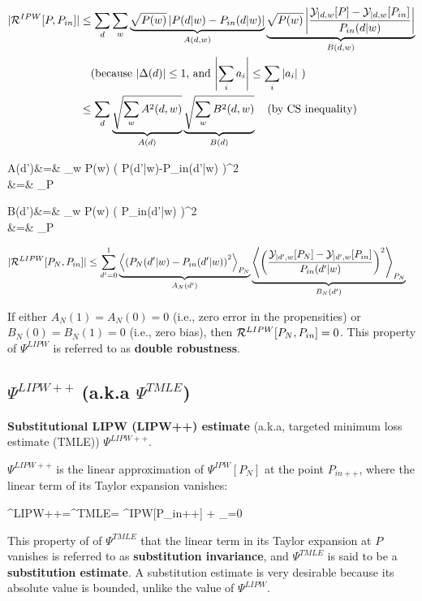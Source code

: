 \begin{align}
|{\cal R}^{IPW}[P,P_{in}]|&\leq
\sum_d \sum_w
\underbrace{\sqrt{P(w)}
\left|
P(d|w)-P_{in}(d|w)
\right|}_{A(d,w)}
\underbrace{\sqrt{P(w)}
\left|
\frac{
{\cal Y}_{|d,w}[P]-{\cal Y}_{|d,w}[P_{in}]}
{P_{in}(d|w)}
\right|}_{B(d,w)}
\nonumber
\\&
\quad\text{(because
$|\Delta(d)|\leq 1$, and $\left|\sum_i a_i\right|\leq \sum_i |a_i|$ )}
\\
&\leq
\sum_d
\underbrace{\sqrt{\sum_w A^2(d,w)}}_{A(d)}
\underbrace{\sqrt{\sum_w B^2(d,w)}}_{B(d)}
\quad \text{(by CS inequality)}
\end{align}

\beqa
A(d')&=&
\sum_w P(w)
\left(
P(d'|w)-P_{in}(d'|w)
\right)^2
\\
&=&
_P
\eeqa

\beqa
B(d')&=&
\sum_w P(w)
\left(
{P_{in}(d'|w)}
\right)^2
\\
&=&
_P
\eeqa

\begin{align}
|{\cal R}^{LIPW}[P_N,P_{in}]|&\leq
\sum_{d'=0}^1
\underbrace{
\left\langle
\left(
P_N(d'|w)-P_{in}(d'|w)
\right)^2
\right\rangle_{P_N}
}_{A_N(d')}
\underbrace{
\left\langle
\left(
\frac{
{\cal Y}_{|d',w}[P_N]-{\cal Y}_{|d',w}[P_{in}]}
{P_{in}(d'|w)}
\right)^2
\right\rangle_{P_N}
}_{B_N(d')}
\end{align}

If either $A_N(1)=A_N(0)=0$ (i.e.,
zero error in the propensities) or $B_N(0)=B_N(1)=0$ (i.e.,
zero bias),
then ${\cal R}^{LIPW}[P_N,P_{in}]=0$.
This property
of $\Psi^{LIPW}$ is referred to as {\bf double robustness}.


\subsection{$\Psi^{LIPW++}$ (a.k.a $\Psi^{TMLE}$)}

{\bf Substitutional LIPW (LIPW++) estimate}
(a.k.a, targeted minimum loss estimate (TMLE)) $\Psi^{LIPW++}$.

$\Psi^{LIPW++}$ is the
linear approximation
 of $\Psi^{IPW}[P_N]$ at the point $P_{in++}$,
where the linear term
of its Taylor expansion vanishes:

\beq
\Psi^{LIPW++}=\Psi^{TMLE}=
\Psi^{IPW}[P_{in++}] +
_{=0}
\eeq

This property of
of $\Psi^{TMLE}$
that the linear term
in its Taylor expansion at $P$ vanishes
is referred to as {\bf substitution
invariance}, and $\Psi^{TMLE}$
is said to be a {\bf substitution estimate}.
A substitution estimate is
very desirable because
its
absolute value is bounded, unlike
the value of $\Psi^{LIPW}$.

